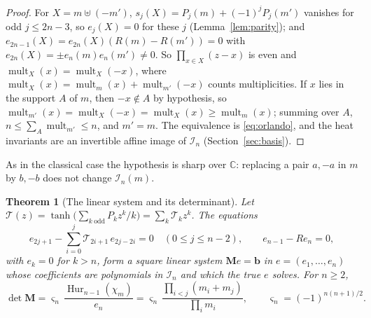 \documentclass[pdflatex,sn-mathphys-num]{sn-jnl}
\theoremstyle{thmstyleone}%
\newtheorem{theorem}{Theorem}[section]%
\theoremstyle{thmstylethree}%
\newcommand{\cI}{\mathcal{I}}
\newcommand{\Hur}{\operatorname{Hur}}
\newcommand{\C}{\mathbb{C}}
\newcommand{\mult}{\operatorname{mult}}
\begin{document}
\begin{proof}
For $X=m\uplus(-m')$, $s_j(X)=P_j(m)+(-1)^jP_j(m')$ vanishes for odd $j\le2n-3$, so $e_j(X)=0$ for these $j$ (Lemma~\ref{lem:parity}); and $e_{2n-1}(X)=e_{2n}(X)(R(m)-R(m'))=0$ with $e_{2n}(X)=\pm e_n(m)e_n(m')\ne0$. So $\prod_{x\in X}(z-x)$ is even and $\mult_X(x)=\mult_X(-x)$, where $\mult_X(x)=\mult_m(x)+\mult_{m'}(-x)$ counts multiplicities. If $x$ lies in the support $A$ of $m$, then $-x\notin A$ by hypothesis, so $\mult_{m'}(x)=\mult_X(-x)=\mult_X(x)\ge\mult_m(x)$; summing over $A$, $n\le\sum_A\mult_{m'}\le n$, and $m'=m$. The equivalence is \eqref{eq:orlando}, and the heat invariants are an invertible affine image of $\cI_n$ (Section~\ref{sec:basis}).
\end{proof}

As in the classical case the hypothesis is sharp over $\C$: replacing a pair $a,-a$ in $m$ by $b,-b$ does not change $\cI_n(m)$.

\begin{theorem}[The linear system and its determinant]\label{thmB}
Let $\mathcal T(z)=\tanh\big(\sum_{k\ \mathrm{odd}}P_kz^k/k\big)=\sum_k\mathcal T_kz^k$. The equations
\begin{equation}\label{eq:linsys}
  e_{2j+1}-\sum_{i=0}^j\mathcal T_{2i+1}\,e_{2j-2i}=0\quad(0\le j\le n-2),\qquad e_{n-1}-Re_n=0,
\end{equation}
with $e_k=0$ for $k>n$, form a square linear system $\mathbf M e=\mathbf b$ in $e=(e_1,\dots,e_n)$ whose coefficients are polynomials in $\cI_n$ and which the true $e$ solves. For $n\ge2$,
\[
  \det\mathbf M=\varsigma_n\,\frac{\Hur_{n-1}(\chi_m)}{e_n}=\varsigma_n\,\frac{\prod_{i<j}(m_i+m_j)}{\prod_im_i},\qquad\varsigma_n=(-1)^{n(n+1)/2}.
\]
\end{theorem}
\end{document}
